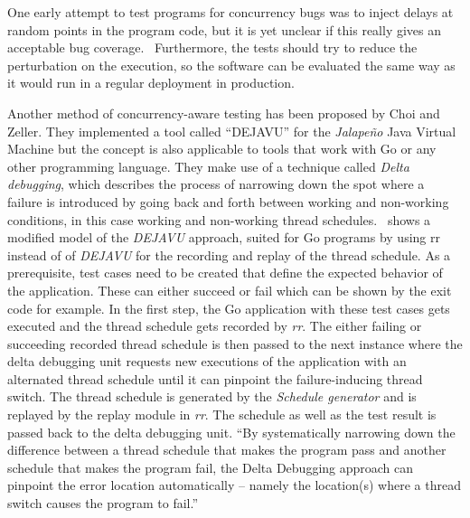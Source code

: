 \documentclass[conference]{IEEEtran}
\begin{document}
One early attempt to test programs for concurrency bugs was to inject delays at random points in the program code, but it is yet unclear if this really gives an acceptable bug coverage.~\cite{lu2008mistakes}
Furthermore, the tests should try to reduce the perturbation on the execution, so the software can be evaluated the same way as it would run in a regular deployment in production.

Another method of concurrency-aware testing has been proposed by Choi and Zeller.\cite{acm2002}
They implemented a tool called ``DEJAVU'' for the \emph{Jalapeño} Java Virtual Machine but the concept is also applicable to tools that work with Go or any other programming language.
They make use of a technique called \emph{Delta debugging}, which describes the process of narrowing down the spot where a failure is introduced by going back and forth between working and non-working conditions, in this case working and non-working thread schedules.~\cite{zeller2002delta}
 shows a modified model of the \emph{DEJAVU} approach, suited for Go programs by using rr instead of of \emph{DEJAVU} for the recording and replay of the thread schedule.
As a prerequisite, test cases need to be created that define the expected behavior of the application.
These can either succeed or fail which can be shown by the exit code for example.
In the first step, the Go application with these test cases gets executed and the thread schedule gets recorded by \emph{rr}.
The either failing or succeeding recorded thread schedule is then passed to the next instance where the delta debugging unit requests new executions of the application with an alternated thread schedule until it can pinpoint the failure-inducing thread switch.
The thread schedule is generated by the \emph{Schedule generator} and is replayed by the replay module in \emph{rr}.
The schedule as well as the test result is passed back to the delta debugging unit.
``By systematically narrowing down the difference between a thread schedule that makes the program pass and another schedule that makes the program fail, the Delta Debugging approach can pinpoint the error location automatically -- namely the location(s) where a thread switch causes the program to fail.''~\cite{acm2002}
\end{document}
